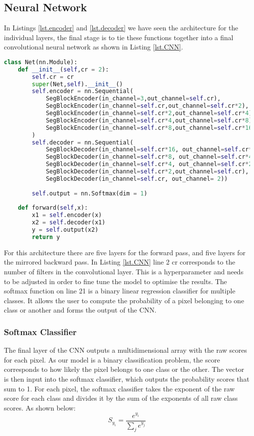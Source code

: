 \subsection{Neural Network}\label{sub.CNN}
In Listings \ref{lst.encoder} and \ref{lst.decoder} we have seen the architecture for the individual layers, the final stage is to tie these functions together into a final convolutional neural network as shown in Listing \ref{lst.CNN}.
\begin{lstlisting}[language=Python, caption = {A Fully connected Convolutional Neural Network. Shows how the encoder and decoder classes are arranged sequentially in order to transform the data and make a prediction on the pixel class.}, label={lst.CNN},float,floatplacement=htbp]
class Net(nn.Module):
    def __init__(self,cr = 2):
        self.cr = cr
        super(Net,self).__init__()
        self.encoder = nn.Sequential(
            SegBlockEncoder(in_channel=3,out_channel=self.cr),
            SegBlockEncoder(in_channel=self.cr,out_channel=self.cr*2),
            SegBlockEncoder(in_channel=self.cr*2,out_channel=self.cr*4),
            SegBlockEncoder(in_channel=self.cr*4,out_channel=self.cr*8),
            SegBlockEncoder(in_channel=self.cr*8,out_channel=self.cr*16)
        )
        self.decoder = nn.Sequential(
            SegBlockDecoder(in_channel=self.cr*16, out_channel=self.cr*8),
            SegBlockDecoder(in_channel=self.cr*8, out_channel=self.cr*4),
            SegBlockDecoder(in_channel=self.cr*4, out_channel=self.cr*2),
            SegBlockDecoder(in_channel=self.cr*2,out_channel=self.cr),
            SegBlockDecoder(in_channel=self.cr, out_channel= 2))
        
        self.output = nn.Softmax(dim = 1)
        
    def forward(self,x):
        x1 = self.encoder(x)
        x2 = self.decoder(x1)
        y = self.output(x2)
        return y
\end{lstlisting}
For this architecture there are five layers for the forward pass, and five layers for the mirrored backward pass. In Listing \ref{lst.CNN} line 2 cr corresponds to the number of filters in the convolutional layer. This is a hyperparameter and needs to be adjusted in order to fine tune the model to optimise the results. The softmax function on line 21 is a binary linear regression classifier for multiple classes. It allows the user to compute the probability of a pixel belonging to one class or another and forms the output of the CNN.
\subsubsection{Softmax Classifier}\label{sec.softmax}
The final layer of the CNN outputs a multidimensional array with the raw scores for each pixel. As our model is a binary classification problem, the score corresponds to how likely the pixel belongs to one class or the other. The vector is then input into the softmax classifier, which outputs the probability scores that sum to 1. For each pixel, the softmax classifier takes the exponent of the raw score for each class and divides it by the sum of the exponents of all raw class scores. As shown below:
\[S_{y_i} = \frac{e^{y_i}}{\sum_j e^{y_j}}\]



